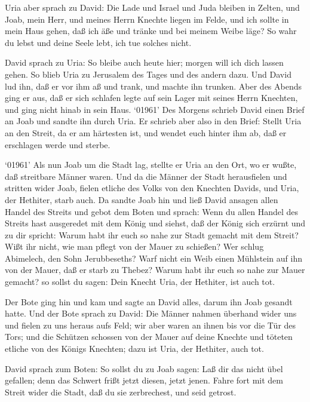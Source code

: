  Uria aber sprach zu David: Die Lade und Israel und Juda
bleiben in Zelten, und Joab, mein Herr, und meines Herrn Knechte liegen
im Felde, und ich sollte in mein Haus gehen, daß ich äße und tränke und
bei meinem Weibe läge? So wahr du lebst und deine Seele lebt, ich tue
solches nicht.

 David sprach zu Uria: So bleibe auch heute hier; morgen
will ich dich lassen gehen. So blieb Uria zu Jerusalem des Tages und des
andern dazu.  Und David lud ihn, daß er vor ihm aß und
trank, und machte ihn trunken. Aber des Abends ging er aus, daß er sich
schlafen legte auf sein Lager mit seines Herrn Knechten, und ging nicht
hinab in sein Haus.  `01961' Des Morgens schrieb David
einen Brief an Joab und sandte ihn durch Uria.  Er schrieb
aber also in den Brief: Stellt Uria an den Streit, da er am härtesten
ist, und wendet euch hinter ihm ab, daß er erschlagen werde und sterbe.

 `01961' Als nun Joab um die Stadt lag, stellte er Uria an
den Ort, wo er wußte, daß streitbare Männer waren.  Und da
die Männer der Stadt herausfielen und stritten wider Joab, fielen
etliche des Volks von den Knechten Davids, und Uria, der Hethiter, starb
auch.  Da sandte Joab hin und ließ David ansagen allen
Handel des Streits  und gebot dem Boten und sprach: Wenn du
allen Handel des Streits hast ausgeredet mit dem König  und
siehst, daß der König sich erzürnt und zu dir spricht: Warum habt ihr
euch so nahe zur Stadt gemacht mit dem Streit? Wißt ihr nicht, wie man
pflegt von der Mauer zu schießen?  Wer schlug Abimelech,
den Sohn Jerubbeseths? Warf nicht ein Weib einen Mühlstein auf ihn von
der Mauer, daß er starb zu Thebez? Warum habt ihr euch so nahe zur Mauer
gemacht? so sollst du sagen: Dein Knecht Uria, der Hethiter, ist auch
tot.

 Der Bote ging hin und kam und sagte an David alles, darum
ihn Joab gesandt hatte.  Und der Bote sprach zu David: Die
Männer nahmen überhand wider uns und fielen zu uns heraus aufs Feld; wir
aber waren an ihnen bis vor die Tür des Tors;  und die
Schützen schossen von der Mauer auf deine Knechte und töteten etliche
von des Königs Knechten; dazu ist Uria, der Hethiter, auch tot.

 David sprach zum Boten: So sollst du zu Joab sagen: Laß
dir das nicht übel gefallen; denn das Schwert frißt jetzt diesen, jetzt
jenen. Fahre fort mit dem Streit wider die Stadt, daß du sie
zerbrechest, und seid getrost.

